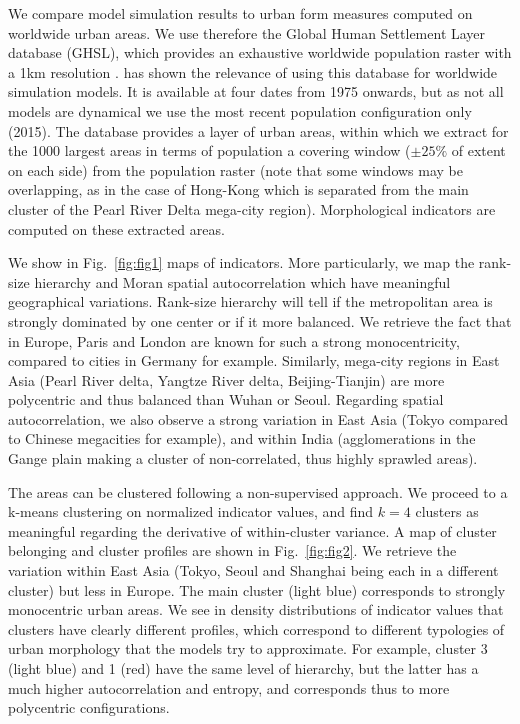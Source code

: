\documentclass[10pt,letterpaper]{article}
\begin{document}
We compare model simulation results to urban form measures computed on worldwide urban areas. We use therefore the Global Human Settlement Layer database (GHSL), which provides an exhaustive worldwide population raster with a 1km resolution \cite{melchiorri2018unveiling}. \cite{Raimbault_2020} has shown the relevance of using this database for worldwide simulation models. It is available at four dates from 1975 onwards, but as not all models are dynamical we use the most recent population configuration only (2015). The database provides a layer of urban areas, within which we extract for the 1000 largest areas in terms of population a covering window ($\pm 25\%$ of extent on each side) from the population raster (note that some windows may be overlapping, as in the case of Hong-Kong which is separated from the main cluster of the Pearl River Delta mega-city region). Morphological indicators are computed on these extracted areas.

We show in Fig.~\ref{fig:fig1} maps of indicators. More particularly, we map the rank-size hierarchy and Moran spatial autocorrelation which have meaningful geographical variations. Rank-size hierarchy will tell if the metropolitan area is strongly dominated by one center or if it more balanced. We retrieve the fact that in Europe, Paris and London are known for such a strong monocentricity, compared to cities in Germany for example. Similarly, mega-city regions in East Asia (Pearl River delta, Yangtze River delta, Beijing-Tianjin) are more polycentric and thus balanced than Wuhan or Seoul. Regarding spatial autocorrelation, we also observe a strong variation in East Asia (Tokyo compared to Chinese megacities for example), and within India (agglomerations in the Gange plain making a cluster of non-correlated, thus highly sprawled areas).

The areas can be clustered following a non-supervised approach. We proceed to a k-means clustering on normalized indicator values, and find $k=4$ clusters as meaningful regarding the derivative of within-cluster variance. A map of cluster belonging and cluster profiles are shown in Fig.~\ref{fig:fig2}. We retrieve the variation within East Asia (Tokyo, Seoul and Shanghai being each in a different cluster) but less in Europe. The main cluster (light blue) corresponds to strongly monocentric urban areas. We see in density distributions of indicator values that clusters have clearly different profiles, which correspond to different typologies of urban morphology that the models try to approximate. For example, cluster 3 (light blue) and 1 (red) have the same level of hierarchy, but the latter has a much higher autocorrelation and entropy, and corresponds thus to more polycentric configurations.
\end{document}
